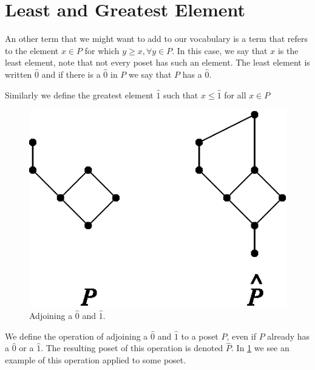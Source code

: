 \section{Least and Greatest Element}
\label{tree:poset:leastandgreatest}

An other term that we might want to add to our vocabulary is a term that refers
to the element $x \in P$ for which $y \geq x, \forall y \in P$. In this case,
we say that $x$ is the least element, note that not every poset has such an
element. The least element is written $\hat{0}$ and if there is a $\hat{0}$ in
$P$ we say that $P$ has a $\hat{0}$.

Similarly we define the greatest element $\hat{1}$ such that $x \leq \hat{1}$
for all $x \in P$

\begin{figure}
	\centering
	\includegraphics[height=0.2\textheight]{fig/stanley/3-3}
	\caption{\label{fig:stanley:3-3} Adjoining a $\hat{0}$ and $\hat{1}$.
\cite{Stanley:2011:ECV:2124415}}
\end{figure}

We define the operation of adjoining a $\hat{0}$ and $\hat{1}$ to a poset $P$,
even if $P$ already has a $\hat{0}$ or a $\hat{1}$. The resulting poset of this
operation is denoted $\hat{P}$. In \ref{fig:stanley:3-3} we see an example of
this operation applied to some poset.



